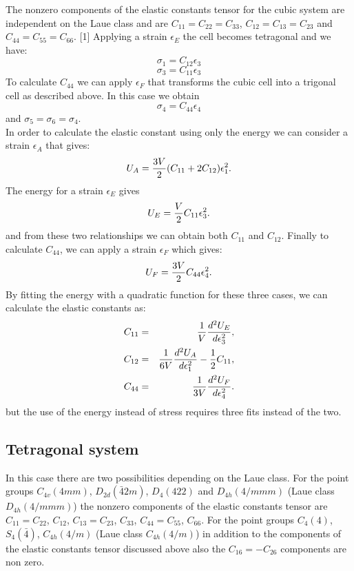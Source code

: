 \documentclass[12pt,a4paper]{article}
\begin{document}
The nonzero components of the elastic constants tensor for the cubic system
are independent on the Laue class and are $C_{11}=C_{22}=C_{33}$,
$C_{12}=C_{13}=C_{23}$ and $C_{44}=C_{55}=C_{66}$. [1]
Applying a strain $\epsilon_E$ the cell becomes tetragonal and we have:
\begin{equation}
\sigma_{1} = C_{12} \epsilon_3
\end{equation}
\begin{equation}
\sigma_{3} = C_{11} \epsilon_3
\end{equation}
To calculate $C_{44}$ we can apply $\epsilon_F$ that
transforms the cubic cell into a trigonal cell as described above. In
this case we obtain
\begin{equation}
\sigma_{4} = C_{44} \epsilon_4
\end{equation}
and $\sigma_{5} = \sigma_{6} = \sigma_{4}$. \\
In order to calculate the elastic constant using only the energy
we can consider a strain $\epsilon_A$ that gives:
\begin{equation}
U_A = {3 V \over 2} (C_{11} + 2C_{12}) \epsilon_1^2.
\end{equation}
The energy for a strain $\epsilon_E$ gives
\begin{equation}
U_E = {V \over 2} C_{11} \epsilon_3^2.
\end{equation}
and from these two relationships we can obtain both $C_{11}$ and $C_{12}$.
Finally to calculate $C_{44}$, we can apply a strain $\epsilon_F$ 
which gives:
\begin{equation}
U_F = {3 V \over 2} C_{44} \epsilon_4^2.
\end{equation}
By fitting the energy with a quadratic function for these three cases,
we can calculate the elastic constants as:
\begin{eqnarray}
C_{11}&=&{1 \over V} {d^2 U_E \over d \epsilon_3^2}, \\ 
C_{12}&=&{1 \over 6 V} {d^2 U_A \over d \epsilon_1^2}  - {1\over 2} C_{11}, \\
C_{44}&=&{1 \over 3 V} {d^2 U_F \over d \epsilon_4^2}.
\end{eqnarray}
but the use of the energy instead of stress requires three fits instead
of the two. 

\subsection{\color{web-blue}Tetragonal system}
In this case there are two possibilities depending on the Laue class.
For the point groups $C_{4v} (4mm)$, $D_{2d} (\bar42m)$, $D_4 (422)$ and
$D_{4h} (4/mmm)$ (Laue class $D_{4h} (4/mmm)$) the nonzero components of the 
elastic constants tensor are
$C_{11}=C_{22}$, $C_{12}$, $C_{13}=C_{23}$, $C_{33}$, $C_{44}=C_{55}$, 
$C_{66}$.
For the point groups $C_{4} (4)$, $S_{4} (\bar4)$, $C_{4h} (4/m)$ (Laue class
$C_{4h} (4/m)$) in addition to the components of the elastic constants tensor
discussed above also the $C_{16}=-C_{26}$ components are non zero.
\end{document}
